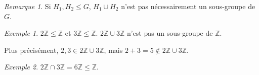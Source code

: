 \documentclass{report}
\newcommand*{\entiers}{\mathbb{Z}}
\theoremstyle{definition}
\theoremstyle{remark}
\newtheorem*{exem}{Exemple}
\newtheorem*{rema}{Remarque}
\begin{document}
	\begin{rema}
		Si $H_1,H_2 \leq G$, $H_1 \cup H_2$ n'est pas n\'ecessairement un sous-groupe de $G$.
		\begin{exem}
			$2\entiers \leq \entiers$ et $3\entiers \leq \entiers$. $2\entiers \cup 3\entiers$ n'est pas un sous-groupe de $\entiers$.

			Plus pr\'ecis\'ement, $2,3 \in 2\entiers \cup 3\entiers$, mais $2+3=5 \not\in 2\entiers \cup 3\entiers$.
		\end{exem}
	\end{rema}
	\begin{exem}
		$2\entiers \cap 3\entiers = 6\entiers \leq \entiers$.
	\end{exem}

	\setcounter{chapter}{1}
	\chapter{}
	\setcounter{section}{3}
\end{document}

